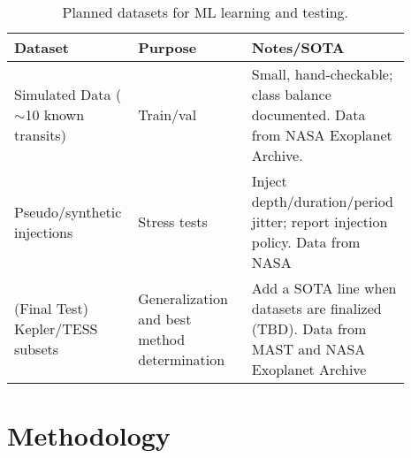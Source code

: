 \documentclass[letterpaper]{article} %
\begin{document}
\begin{table}[t]
\centering
\begin{tabular}{p{0.28\linewidth} p{0.28\linewidth} p{0.33\linewidth}}
\hline
\textbf{Dataset} & \textbf{Purpose} & \textbf{Notes/SOTA} \\ \hline
Simulated Data ($\sim$10 known transits) & Train/val & Small, hand-checkable; class balance documented. Data from NASA Exoplanet Archive. \\
Pseudo/synthetic injections & Stress tests & Inject depth/duration/period jitter; report injection policy. Data from NASA \\
(Final Test) Kepler/TESS subsets & Generalization and best method determination & Add a SOTA line when datasets are finalized (TBD). Data from MAST and NASA Exoplanet Archive \\ \hline
\end{tabular}
\caption{{Planned datasets for ML learning and testing.}}
\label{{tab:datasets}}
\end{table}

\section*{Methodology}
\end{document}
